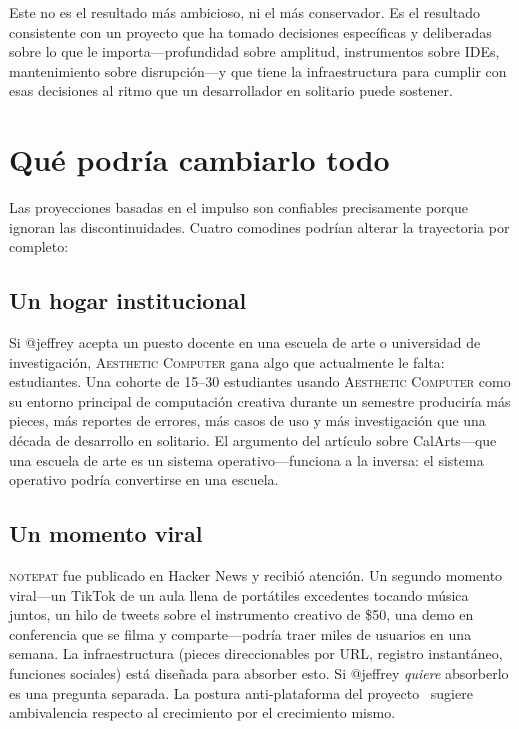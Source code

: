 \documentclass[10pt,letterpaper,twocolumn]{article}
\newcommand{\ac}{\textsc{Aesthetic Computer}}
\newcommand{\np}{\textsc{notepat}}
\begin{document}
Este no es el resultado más ambicioso, ni el más conservador. Es el resultado consistente con un proyecto que ha tomado decisiones específicas y deliberadas sobre lo que le importa---profundidad sobre amplitud, instrumentos sobre IDEs, mantenimiento sobre disrupción---y que tiene la infraestructura para cumplir con esas decisiones al ritmo que un desarrollador en solitario puede sostener.


\section{Qué podría cambiarlo todo}
\label{sec:wildcards}

Las proyecciones basadas en el impulso son confiables precisamente porque ignoran las discontinuidades. Cuatro comodines podrían alterar la trayectoria por completo:

\subsection{Un hogar institucional}

Si @jeffrey acepta un puesto docente en una escuela de arte o universidad de investigación, \ac{} gana algo que actualmente le falta: estudiantes. Una cohorte de 15--30 estudiantes usando \ac{} como su entorno principal de computación creativa durante un semestre produciría más pieces, más reportes de errores, más casos de uso y más investigación que una década de desarrollo en solitario. El argumento del artículo sobre CalArts---que una escuela de arte es un sistema operativo---funciona a la inversa: el sistema operativo podría convertirse en una escuela.

\subsection{Un momento viral}

\np{} fue publicado en Hacker News y recibió atención. Un segundo momento viral---un TikTok de un aula llena de portátiles excedentes tocando música juntos, un hilo de tweets sobre el instrumento creativo de \$50, una demo en conferencia que se filma y comparte---podría traer miles de usuarios en una semana. La infraestructura (pieces direccionables por URL, registro instantáneo, funciones sociales) está diseñada para absorber esto. Si @jeffrey \emph{quiere} absorberlo es una pregunta separada. La postura anti-plataforma del proyecto~\citep{fisher2009capitalist} sugiere ambivalencia respecto al crecimiento por el crecimiento mismo.
\end{document}
